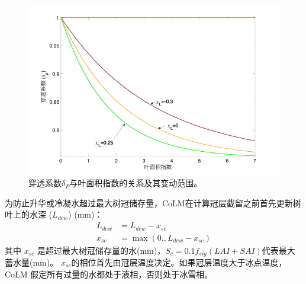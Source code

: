 {
\begin{figure}[]
\centering
\includegraphics{Figures/陆地表面的水分循环/穿透系数与叶面积指数.png}
\caption{穿透系数$\delta_P$与叶面积指数的关系及其变动范围。}
\label{fig:穿透系数与叶面积指数}
\end{figure}
}

为防止升华或冷凝水超过最大树冠储存量，CoLM在计算冠层截留之前首先更新树叶上的水深 ($L_{dew}$) (mm)：
\begin{equation}
\begin{aligned}
L_{dew} &= L_{dew}-x_{sc} \\
x_{s c} &= \max \left(0., L_{dew}-x_{sc}\right)
\end{aligned}
\end{equation}
其中 $x_{sc}$ 是超过最大树冠储存量的水(mm)，$S_c=0.1f_{sig}\left(LAI+SAI\right)$代表最大蓄水量(mm)。
$x_{sc}$的相位首先由冠层温度决定。如果冠层温度大于冰点温度，CoLM 假定所有过量的水都处于液相，否则处于冰雪相。


